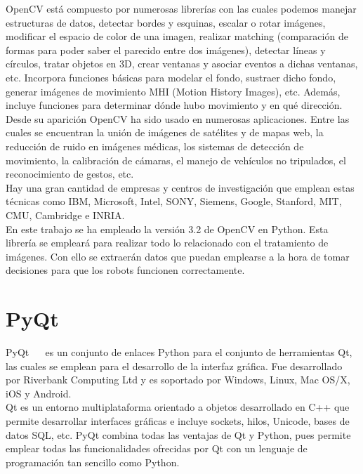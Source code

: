 OpenCV está compuesto por numerosas librerías con las cuales podemos manejar estructuras de datos, detectar bordes y esquinas, escalar o rotar imágenes, modificar el espacio de color de una imagen, realizar matching (comparación de formas para poder saber el parecido entre dos imágenes), detectar líneas y círculos, tratar objetos en 3D, crear ventanas y asociar eventos a dichas ventanas, etc. Incorpora funciones básicas para modelar el fondo, sustraer dicho fondo, generar imágenes de movimiento MHI (Motion History Images), etc. Además, incluye funciones para determinar dónde hubo movimiento y en qué dirección. \\


Desde su aparición OpenCV ha sido usado en numerosas aplicaciones. Entre las cuales se encuentran la unión de imágenes de satélites y de mapas web, la reducción de ruido en imágenes médicas, los sistemas de detección de movimiento, la calibración de cámaras, el manejo de vehículos no tripulados, el reconocimiento de gestos, etc. \\

Hay una gran cantidad de empresas y centros de investigación que emplean estas técnicas como IBM, Microsoft, Intel, SONY, Siemens, Google, Stanford, MIT, CMU, Cambridge e INRIA.\\

En este trabajo se ha empleado la versión 3.2 de OpenCV en Python. Esta librería se empleará para realizar todo lo relacionado con el tratamiento de imágenes. Con ello se extraerán datos que puedan emplearse a la hora de tomar decisiones para que los robots funcionen correctamente.

\section{PyQt}
PyQt~\cite{python1} ~\cite{pqt} es un conjunto de enlaces Python para el conjunto de herramientas Qt, las cuales se emplean para el desarrollo de la interfaz gráfica. Fue desarrollado por Riverbank Computing Ltd y es soportado por Windows, Linux, Mac OS/X, iOS y Android.\\

Qt es un entorno multiplataforma orientado a objetos desarrollado en C++  que permite desarrollar interfaces gráficas e incluye sockets, hilos, Unicode, bases de datos SQL, etc. PyQt combina todas las ventajas de Qt y Python, pues permite emplear todas las funcionalidades ofrecidas por Qt con un lenguaje de programación tan sencillo como Python.\\

